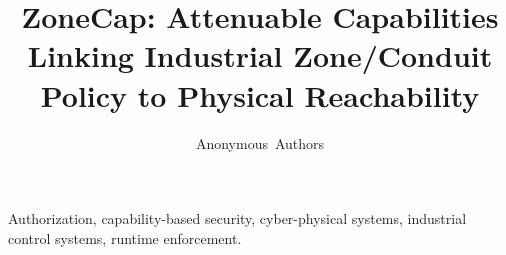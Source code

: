 \documentclass[journal,twoside,web]{ieeecolor}
\begin{document}
\title{ZoneCap: Attenuable Capabilities Linking Industrial Zone/Conduit Policy to Physical Reachability}
\author{Anonymous~Authors}

\maketitle

\begin{abstract}

\end{abstract}

\begin{IEEEkeywords}
Authorization, capability-based security, cyber-physical systems, industrial control systems, runtime enforcement.
\end{IEEEkeywords}












\end{document}
